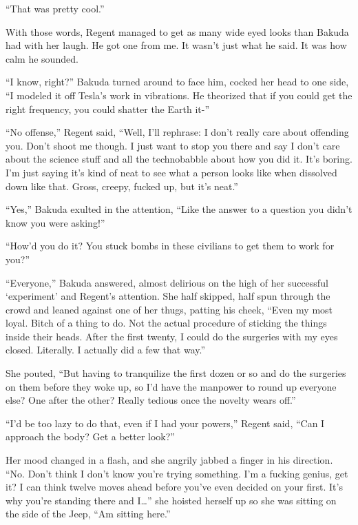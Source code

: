 ``That was pretty cool.''



With those words, Regent managed to get as many wide eyed looks than Bakuda had with her laugh.  He got one from me.  It wasn't just what he said.  It was how calm he sounded.



``I know, right?'' Bakuda turned around to face him, cocked her head to one side, ``I modeled it off Tesla's work in vibrations.  He theorized that if you could get the right frequency, you could shatter the Earth it-''



``No offense,'' Regent said, ``Well, I'll rephrase: I don't really care about offending you.  Don't shoot me though.  I just want to stop you there and say I don't care about the science stuff and all the technobabble about how you did it.  It's boring.  I'm just saying it's kind of neat to see what a person looks like when dissolved down like that.  Gross, creepy, fucked up, but it's neat.''



``Yes,'' Bakuda exulted in the attention, ``Like the answer to a question you didn't know you were asking!''



``How'd you do it?  You stuck bombs in these civilians to get them to work for you?''



``Everyone,'' Bakuda answered, almost delirious on the high of her successful `experiment' and Regent's attention.  She half skipped, half spun through the crowd and leaned against one of her thugs, patting his cheek, ``Even my most loyal.  Bitch of a thing to do.  Not the actual procedure of sticking the things inside their heads.  After the first twenty, I could do the surgeries with my eyes closed.  Literally.  I actually did a few that way.''



She pouted, ``But having to tranquilize the first dozen or so and do the surgeries on them before they woke up, so I'd have the manpower to round up everyone else?  One after the other?  Really tedious once the novelty wears off.''



``I'd be too lazy to do that, even if I had your powers,'' Regent said, ``Can I approach the body?  Get a better look?''



Her mood changed in a flash, and she angrily jabbed a finger in his direction. ``No.  Don't think I don't know you're trying something.  I'm a fucking genius, get it?  I can think twelve moves ahead before you've even decided on your first.  It's why you're standing there and I\ldots'' she hoisted herself up so she was sitting on the side of the Jeep, ``Am sitting here.''




